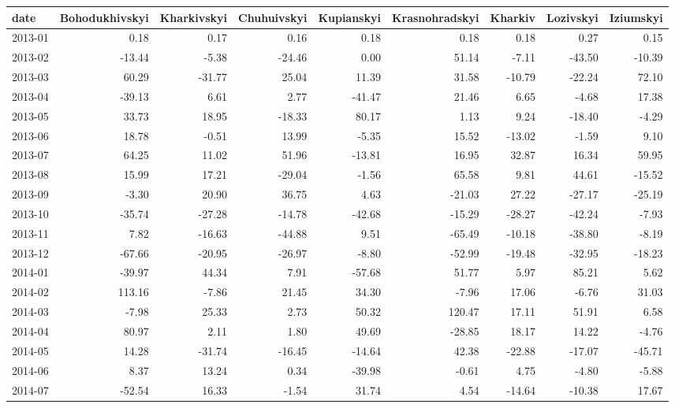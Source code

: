 \begin{table}[ht]
\centering
\begin{tabular}{lrrrrrrrr}
  \hline
date & Bohodukhivskyi & Kharkivskyi & Chuhuivskyi & Kupianskyi & Krasnohradskyi & Kharkiv & Lozivskyi & Iziumskyi \\ 
  \hline
2013-01 & 0.18 & 0.17 & 0.16 & 0.18 & 0.18 & 0.18 & 0.27 & 0.15 \\ 
  2013-02 & -13.44 & -5.38 & -24.46 & 0.00 & 51.14 & -7.11 & -43.50 & -10.39 \\ 
  2013-03 & 60.29 & -31.77 & 25.04 & 11.39 & 31.58 & -10.79 & -22.24 & 72.10 \\ 
  2013-04 & -39.13 & 6.61 & 2.77 & -41.47 & 21.46 & 6.65 & -4.68 & 17.38 \\ 
  2013-05 & 33.73 & 18.95 & -18.33 & 80.17 & 1.13 & 9.24 & -18.40 & -4.29 \\ 
  2013-06 & 18.78 & -0.51 & 13.99 & -5.35 & 15.52 & -13.02 & -1.59 & 9.10 \\ 
  2013-07 & 64.25 & 11.02 & 51.96 & -13.81 & 16.95 & 32.87 & 16.34 & 59.95 \\ 
  2013-08 & 15.99 & 17.21 & -29.04 & -1.56 & 65.58 & 9.81 & 44.61 & -15.52 \\ 
  2013-09 & -3.30 & 20.90 & 36.75 & 4.63 & -21.03 & 27.22 & -27.17 & -25.19 \\ 
  2013-10 & -35.74 & -27.28 & -14.78 & -42.68 & -15.29 & -28.27 & -42.24 & -7.93 \\ 
  2013-11 & 7.82 & -16.63 & -44.88 & 9.51 & -65.49 & -10.18 & -38.80 & -8.19 \\ 
  2013-12 & -67.66 & -20.95 & -26.97 & -8.80 & -52.99 & -19.48 & -32.95 & -18.23 \\ 
  2014-01 & -39.97 & 44.34 & 7.91 & -57.68 & 51.77 & 5.97 & 85.21 & 5.62 \\ 
  2014-02 & 113.16 & -7.86 & 21.45 & 34.30 & -7.96 & 17.06 & -6.76 & 31.03 \\ 
  2014-03 & -7.98 & 25.33 & 2.73 & 50.32 & 120.47 & 17.11 & 51.91 & 6.58 \\ 
  2014-04 & 80.97 & 2.11 & 1.80 & 49.69 & -28.85 & 18.17 & 14.22 & -4.76 \\ 
  2014-05 & 14.28 & -31.74 & -16.45 & -14.64 & 42.38 & -22.88 & -17.07 & -45.71 \\ 
  2014-06 & 8.37 & 13.24 & 0.34 & -39.98 & -0.61 & 4.75 & -4.80 & -5.88 \\ 
  2014-07 & -52.54 & 16.33 & -1.54 & 31.74 & 4.54 & -14.64 & -10.38 & 17.67 \\ 

\end{tabular}
\end{table}
